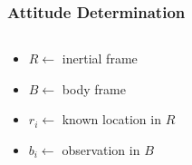 \documentclass[11pt]{beamer}
\begin{document}
\begin{frame}
\begin{columns}
\begin{column}{0.5\textwidth}
            \end{column}
        \end{columns}
    \end{frame}

    \begin{frame}
        \frametitle{Attitude Determination}
        \begin{columns}
            \begin{column}{0.5\textwidth}
                \begin{itemize}
                    \item $R \gets$ inertial frame \bigskip
                    \item $B \gets$ body frame \bigskip
                    \item $r_i \gets$ known location in $R$ \bigskip
                    \item $b_i \gets$ observation in $B$
                \end{itemize} \bigskip
            \end{column}
            \begin{column}{0.55\textwidth}
            \end{column}
        \end{columns} \bigskip
    \end{frame}
\end{document}
